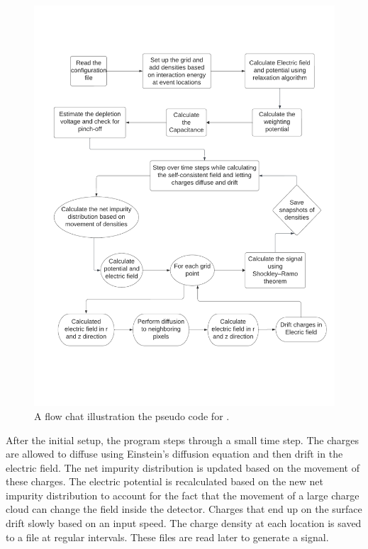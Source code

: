 \begin{figure}
\centering
\includegraphics[width=0.99\linewidth,trim={2pc 10pc 1.5pc 9pc},clip]{ch3/figs/ehd_flowchart.pdf}
\caption{A flow chat illustration the pseudo code for {\tdsim}.}
\label{fig:ehd_flowchart}
\end{figure}

After the initial setup, the program steps through a small time step. The charges are allowed to diffuse using Einstein's diffusion equation and then drift in the electric field. The net impurity distribution is updated based on the movement of these charges. The electric potential is recalculated based on the new net impurity distribution to account for the fact that the movement of a large charge cloud can change the field inside the detector. Charges that end up on the surface drift slowly based on an input speed. The charge density at each location is saved to a file at regular intervals. These files are read later to generate a signal.

